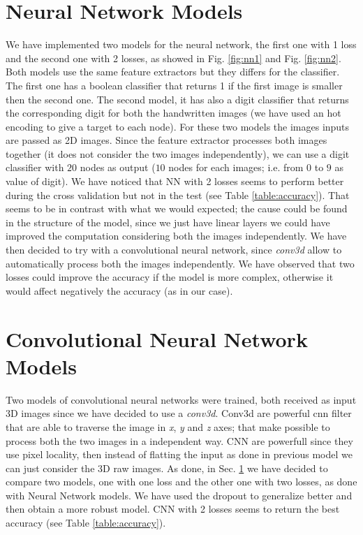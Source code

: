 \documentclass[journal, a4paper]{IEEEtran}
\begin{document}
\section{Neural Network Models}
\label{sec:nnmodel}
We have implemented two models for the neural network, the first one with 1 loss and the second one with 2 losses, as showed in Fig. \ref{fig:nn1} and Fig. \ref{fig:nn2}. Both models use the same feature extractors but they differs for the classifier. The first one has a boolean classifier that returns 1 if the first image is smaller then the second one. The second model, it has also a digit classifier that returns the corresponding digit for both the handwritten images (we have used an hot encoding to give a target to each node).
For these two models the images inputs are passed as 2D images.  Since the feature extractor processes both images together (it does not consider the two images independently), we can use a digit classifier with $20$ nodes as output ($10$ nodes for each images; i.e. from $0$ to $9$ as value of digit). We have noticed that NN with 2 losses seems to perform better during the cross validation but not in the test (see Table \ref{table:accuracy}). That seems to be in contrast with what we would expected; the cause could be found in the structure of the model, since we just have linear layers we could have improved the computation considering both the images independently. We have then decided to try with a convolutional neural network, since \textit{conv3d} allow to automatically process both the images independently. We have observed that two losses could improve the accuracy if the model is more complex, otherwise it would affect negatively the accuracy (as in our case).


\section{Convolutional Neural Network Models}
\label{sec:cnnmodel}
Two models of convolutional neural networks were trained, both received as input 3D images since we have decided to use a \textit{conv3d}. Conv3d are powerful cnn filter that are able to traverse the image in \textit{x}, \textit{y} and \textit{z} axes; that make possible to process both the two images in a independent way. CNN are powerfull since they use pixel locality, then instead of flatting the input as done in previous model we can just consider the 3D raw images. As done, in Sec. \ref{sec:nnmodel} we have decided to compare two models, one with one loss and the other one with two losses, as done with Neural Network models. 
We have used the dropout to generalize better and then obtain a more robust model. CNN with 2 losses seems to return the best accuracy (see Table \ref{table:accuracy}).
\end{document}
